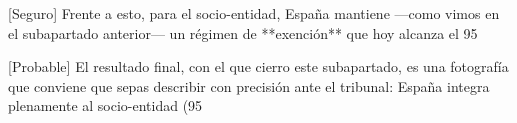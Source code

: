 \documentclass[10pt,a4paper]{article}
\begin{document}
[Seguro] Frente a esto, para el socio-entidad, España mantiene —como vimos en el subapartado anterior— un régimen de **exención** que hoy alcanza el 95%

[Probable] El resultado final, con el que cierro este subapartado, es una fotografía que conviene que sepas describir con precisión ante el tribunal: España integra plenamente al socio-entidad (95%
\end{document}
